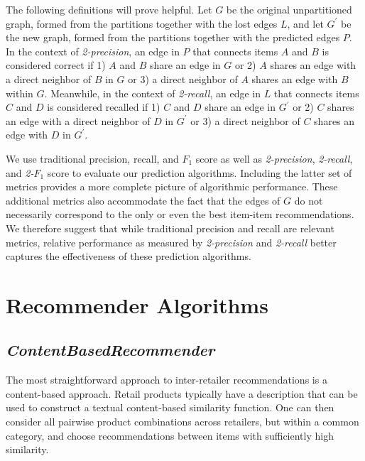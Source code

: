 \documentclass[11pt]{article}
\begin{document}
The following definitions will prove helpful. Let $G$ be the original
unpartitioned graph, formed from the partitions together with the lost edges
$L$, and let $G^{\prime}$ be the new graph, formed from the partitions together
with the predicted edges $P$.  In the context of {\em 2-precision}, an edge in
$P$ that connects items $A$ and $B$ is considered correct if 1) $A$ and $B$
share an edge in $G$ or 2) $A$ shares an edge with a direct neighbor of $B$ in
$G$ or 3) a direct neighbor of $A$ shares an edge with $B$ within $G$.
Meanwhile, in the context of {\em 2-recall}, an edge in $L$ that connects items
$C$ and $D$ is considered recalled if 1) $C$ and $D$ share an edge in
$G^{\prime}$ or 2) $C$ shares an edge with a direct neighbor of $D$ in
$G^{\prime}$ or 3) a direct neighbor of $C$ shares an edge with $D$ in
$G^{\prime}$.

We use traditional precision, recall, and $F_1$ score as well as {\em
2-precision}, {\em 2-recall}, and {\em 2-}$F_1$ score to evaluate our prediction
algorithms. Including the latter set of metrics provides a more complete picture
of algorithmic performance. These additional metrics also accommodate the fact
that the edges of $G$ do not necessarily correspond to the only or even the best
item-item recommendations. We therefore suggest that while traditional precision
and recall are relevant metrics, relative performance as measured by {\em
2-precision} and {\em 2-recall} better captures the effectiveness of these
prediction algorithms.

\section*{Recommender Algorithms}

\subsection*{\em ContentBasedRecommender}
The most straightforward approach to inter-retailer recommendations is a
content-based approach. Retail products typically have a description that can be
used to construct a textual content-based similarity function. One can then
consider all pairwise product combinations across retailers, but within a common
category, and choose recommendations between items with sufficiently high
similarity.
\end{document}
